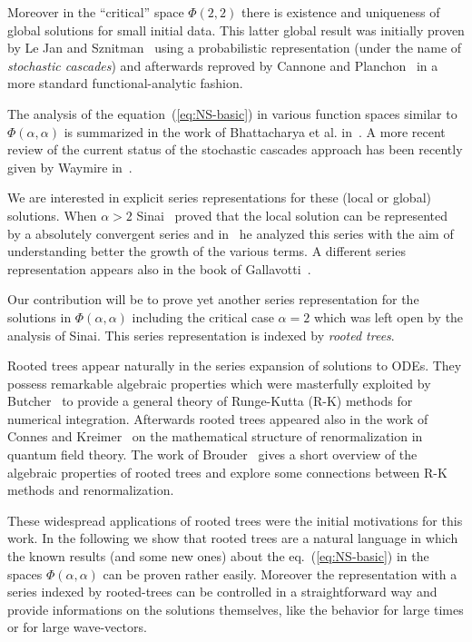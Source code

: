 \documentclass[a4paper,12pt,reqno]{amsart}
\newcommand{\1}{{\bf 1}}
\begin{document}
Moreover in the ``critical'' space $\Phi(2,2)$ there is existence and
uniqueness of
global solutions for small initial data. This latter global result
was initially proven  by Le Jan and Sznitman~\cite{LS} using a probabilistic representation (under the name of \emph{stochastic cascades})
and afterwards reproved by Cannone and Planchon~\cite{CP} in a more standard
functional-analytic fashion. 

The analysis of the equation~(\ref{eq:NS-basic}) in various function spaces similar to $\Phi(\alpha,\alpha)$ is summarized in the work of  Bhattacharya et al. in~\cite{MR1997593}. A more recent review of the current status of the stochastic cascades approach has been recently given by Waymire in~\cite{MR2121794}.

We are interested in explicit series representations for these (local or global) solutions.
When $\alpha > 2$ Sinai~\cite{Sinai2} proved  that the local solution can be
represented by a absolutely convergent series and in~\cite{Sinai3} he
analyzed this series with the aim of understanding better the growth of
the various terms.
A different series representation  appears also in the book of Gallavotti~\cite{Gall}.

Our contribution will be to prove yet another series representation
for the solutions in $\Phi(\alpha,\alpha)$ including the critical case
$\alpha=2$ which was left open by the analysis of Sinai. This 
series representation is indexed by \emph{rooted trees}. 

Rooted trees appear naturally in the series expansion of solutions to
ODEs. They possess remarkable algebraic properties which were
masterfully exploited by Butcher~\cite{Butch} to provide a general
theory of Runge-Kutta (R-K) methods for numerical integration. 
Afterwards rooted trees appeared also in the work of Connes and Kreimer~\cite{CK}
on the mathematical structure of renormalization in quantum field
theory. The work of Brouder~\cite{Broud,Bit} gives  a short overview
of the algebraic properties of rooted trees and explore some connections
between R-K methods and renormalization.  

These widespread applications of rooted trees were the
initial motivations for this work. In the following we show that
rooted trees are a natural language in which the known results (and
some new ones) about
the eq.~(\ref{eq:NS-basic}) in the spaces $\Phi(\alpha,\alpha)$ can be
proven rather easily. Moreover the representation with a series
indexed by rooted-trees can be controlled in a straightforward way  and provide   informations on the solutions themselves, like the behavior for large times or for large wave-vectors.
\end{document}
